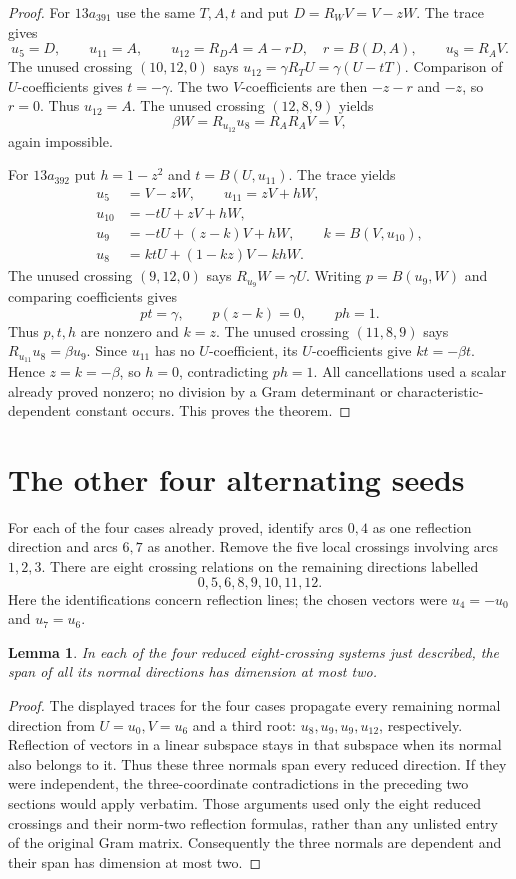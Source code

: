 \documentclass[11pt]{article}
\newtheorem{lemma}[theorem]{Lemma}
\begin{document}
\begin{proof}
For $13a_{391}$ use the same $T,A,t$ and put $D=R_WV=V-zW$.
The trace gives
\[
 u_5=D,\qquad u_{11}=A,\qquad
 u_{12}=R_DA=A-rD,\quad r=B(D,A),\qquad u_8=R_AV.
\]
The unused crossing $(10,12,0)$ says
$u_{12}=\gamma R_TU=\gamma(U-tT)$.
Comparison of $U$-coefficients gives $t=-\gamma$.
The two $V$-coefficients are then $-z-r$ and $-z$, so $r=0$.
Thus $u_{12}=A$. The unused crossing $(12,8,9)$ yields
\[
                      \beta W=R_{u_{12}}u_8=R_AR_AV=V,
\]
again impossible.

For $13a_{392}$ put $h=1-z^2$ and
$t=B(U,u_{11})$. The trace yields
\[
\begin{split}
 u_5&=V-zW,\qquad u_{11}=zV+hW,\\
 u_{10}&=-tU+zV+hW,\\
 u_9&=-tU+(z-k)V+hW,\qquad k=B(V,u_{10}),\\
 u_8&=ktU+(1-kz)V-khW.
\end{split}
\]
The unused crossing $(9,12,0)$ says $R_{u_9}W=\gamma U$.
Writing $p=B(u_9,W)$ and comparing coefficients gives
\[
                       pt=\gamma,\qquad p(z-k)=0,\qquad ph=1.
\]
Thus $p,t,h$ are nonzero and $k=z$. The unused crossing
$(11,8,9)$ says $R_{u_{11}}u_8=\beta u_9$.
Since $u_{11}$ has no $U$-coefficient, its $U$-coefficients give
$kt=-\beta t$. Hence $z=k=-\beta$, so $h=0$, contradicting $ph=1$.
All cancellations used a scalar already proved nonzero; no division
by a Gram determinant or characteristic-dependent constant occurs.
This proves the theorem.
\end{proof}

\section{The other four alternating seeds}

For each of the four cases already proved, identify arcs $0,4$ as one
reflection direction and arcs $6,7$ as another. Remove the five local
crossings involving arcs $1,2,3$. There are eight crossing relations
on the remaining directions labelled
\[
                           0,5,6,8,9,10,11,12.
\]
Here the identifications concern reflection lines; the chosen vectors
were $u_4=-u_0$ and $u_7=u_6$.

\begin{lemma}\label{lem:reduced}
In each of the four reduced eight-crossing systems just described,
the span of all its normal directions has dimension at most two.
\end{lemma}
\begin{proof}
The displayed traces for the four cases propagate every remaining
normal direction from $U=u_0,V=u_6$ and a third root:
$u_8,u_9,u_9,u_{12}$, respectively. Reflection of vectors in a linear
subspace stays in that subspace when its normal also belongs to it.
Thus these three normals span every reduced direction.
If they were independent, the three-coordinate contradictions in the
preceding two sections would apply verbatim. Those arguments used
only the eight reduced crossings and their norm-two reflection
formulas, rather than any unlisted entry of the original Gram matrix.
Consequently the three normals are dependent and their span has
dimension at most two.
\end{proof}
\end{document}
